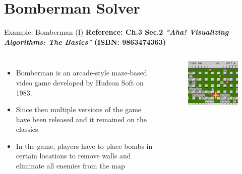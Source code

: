 \documentclass[10pt,xcolor={table,dvipsnames},t]{beamer}
\begin{document}
\section{Bomberman Solver}
\begin{frame}{Example: Bomberman (I)}
  \textbf{Reference: Ch.3 Sec.2 \textit{"Aha! Visualizing Algorithms: The Basics"} (ISBN: 9863474363)}
  \begin{columns}
    \begin{itemize}
      \item Bomberman is an arcade-style maze-based video game developed by Hudson Soft on 1983.
      \item Since then multiple versions of the game have been released and it remained on the classics
      \item In the game, players have to place bombs in certain locations to remove walls and eliminate all enemies from the map
    \end{itemize}
    \begin{figure}
      \includegraphics[width=\textwidth]{img/bomberman_nes.png}
    \end{figure}
  \end{columns}
\end{frame}
\end{document}
